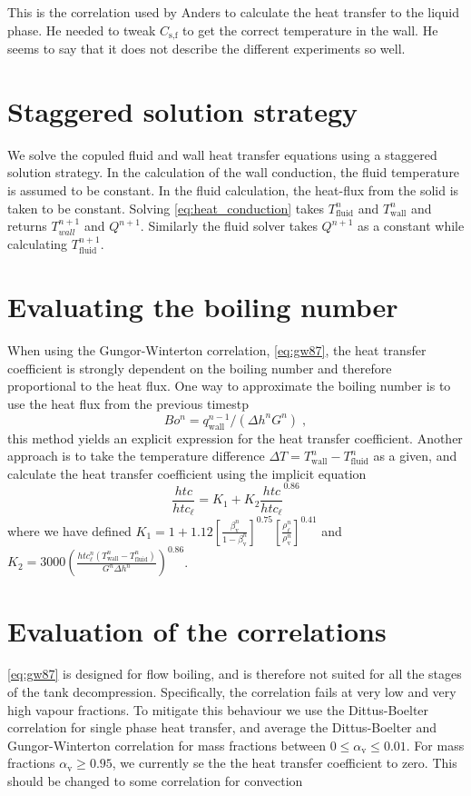 \documentclass{article}
\begin{document}
This is the correlation used by Anders to calculate the heat transfer to the liquid phase. He needed to tweak $C_{\text{s,f}}$ to get the correct temperature in the wall. He seems to say that it does not describe the different experiments so well.
\section{Staggered solution strategy}
We solve the copuled fluid and wall heat transfer equations using a staggered solution strategy. In the calculation of the wall conduction, the fluid temperature is assumed to be constant. In the fluid calculation, the heat-flux from the solid is taken to be constant. Solving \cref{eq:heat_conduction} takes $T_{\text{fluid}}^n$ and $T_{\text{wall}}^n$ and returns $T_{wall}^{n+1}$ and $Q^{n+1}$. Similarly the fluid solver takes $Q^{n+1}$ as a constant while calculating $T_{\text{fluid}}^{n+1}$.

\section{Evaluating the boiling number}
When using the Gungor-Winterton correlation, \cref{eq:gw87}, the heat transfer coefficient is strongly dependent on the boiling number and therefore proportional to the heat flux. One way to approximate the boiling number is to use the heat flux from the previous timestp 
\begin{equation}
    Bo^{n} = q_{\text{wall}}^{n-1} / (\Delta h^{n} G^{n})\;,
\end{equation}
this method yields an explicit expression for the heat transfer coefficient. Another approach is to take the temperature difference $\Delta T = T_{\text{wall}}^n - T_{\text{fluid}}^n$ as a given, and calculate the heat transfer coefficient using the implicit equation
\begin{equation}
    \frac{htc}{htc_{\ell}} = K_{1} + K_{2} \frac{htc}{htc_{\ell}}^{0.86} 
\end{equation}
where we have defined $K_{1} = 1 + 1.12 \left[\frac{\beta_{\text{v}}^n}{1-\beta_{\text{v}}^n}\right]^{0.75} \left[ \frac{\rho_{\ell}^n}{\rho_{\text{v}}^n} \right]^{0.41}$ and $K_{2} = 3000\left( \frac{htc_{\ell}^n \left( T_{\text{wall}}^n - T_{\text{fluid}}^n\right)}{G^n \Delta h^n} \right)^{0.86}$. 

\section{Evaluation of the correlations}
\cref{eq:gw87} is designed for flow boiling, and is therefore not suited for all the stages of the tank decompression. Specifically, the correlation fails at very low and very high vapour fractions. To mitigate this behaviour we use the Dittus-Boelter correlation for single phase heat transfer, and average the Dittus-Boelter and Gungor-Winterton correlation for mass fractions between $0 \leq \alpha_{\text{v}} \leq 0.01$. For mass fractions $\alpha_{\text{v}} \geq 0.95$, we currently se the the heat transfer coefficient to zero. This should be changed to some correlation for convection
\end{document}
